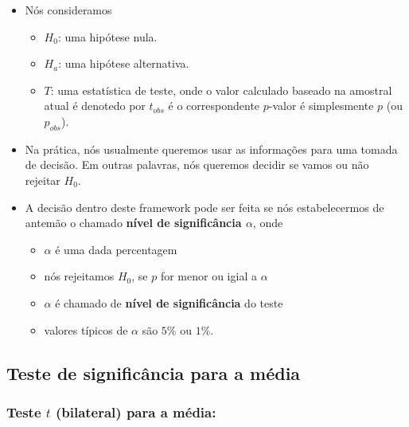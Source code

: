 \documentclass[]{article}
\providecommand{\tightlist}{%
  \setlength{\itemsep}{0pt}\setlength{\parskip}{0pt}}
\begin{document}
\begin{itemize}
\tightlist
\item
  Nós consideramos

  \begin{itemize}
  \tightlist
  \item
    \(H_0\): uma hipótese nula.
  \item
    \(H_a\): uma hipótese alternativa.
  \item
    \(T\): uma estatística de teste, onde o valor calculado baseado na
    amostral atual é denotedo por \(t_{obs}\) é o correspondente
    \(p\)-valor é simplesmente \(p\) (ou \(p_{obs}\)).
  \end{itemize}
\item
  Na prática, nós usualmente queremos usar as informações para uma
  tomada de decisão. Em outras palavras, nós queremos decidir se vamos
  ou não rejeitar \(H_0\).
\item
  A decisão dentro deste framework pode ser feita se nós estabelecermos
  de antemão o chamado \textbf{nível de significância \(\alpha\)}, onde

  \begin{itemize}
  \tightlist
  \item
    \(\alpha\) é uma dada percentagem
  \item
    nós rejeitamos \(H_0\), se \(p\) for menor ou igial a \(\alpha\)
  \item
    \(\alpha\) é chamado de \textbf{nível de significância} do teste
  \item
    valores típicos de \(\alpha\) são \(5\%\) ou \(1\%\).
  \end{itemize}
\end{itemize}

\subsection{Teste de significância para a
média}\label{teste-de-significancia-para-a-media}

\subsubsection{\texorpdfstring{Teste \(t\) (bilateral) para a
média:}{Teste t (bilateral) para a média:}}\label{teste-t-bilateral-para-a-media}
\end{document}
